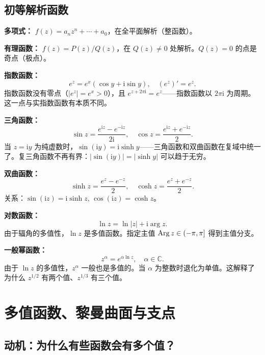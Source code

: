 \subsection{初等解析函数}

\textbf{多项式：} $f(z) = a_n z^n + \cdots + a_0$，在全平面解析（整函数）。

\textbf{有理函数：} $f(z) = P(z)/Q(z)$，在 $Q(z)\neq0$ 处解析。$Q(z)=0$ 的点是奇点（极点）。

\textbf{指数函数：}
\begin{equation}
e^z = e^x(\cos y + \mathrm{i}\sin y),\quad
(e^z)' = e^z.
\end{equation}
指数函数没有零点（$|e^z| = e^x > 0$），且 $e^{z+2\pi\mathrm{i}} = e^z$——指数函数以 $2\pi\mathrm{i}$ 为周期。这一点与实指数函数有本质不同。

\textbf{三角函数：}
\begin{equation}
\sin z = \frac{e^{\mathrm{i}z} - e^{-\mathrm{i}z}}{2\mathrm{i}},\quad
\cos z = \frac{e^{\mathrm{i}z} + e^{-\mathrm{i}z}}{2}.
\end{equation}
当 $z=\mathrm{i}y$ 为纯虚数时，$\sin(\mathrm{i}y) = \mathrm{i}\sinh y$——三角函数和双曲函数在复域中统一了。复三角函数不再有界：$|\sin(\mathrm{i}y)| = |\sinh y|$ 可以趋于无穷。

\textbf{双曲函数：}
\begin{equation}
\sinh z = \frac{e^z - e^{-z}}{2},\quad
\cosh z = \frac{e^z + e^{-z}}{2}.
\end{equation}
关系：$\sin(\mathrm{i}z) = \mathrm{i}\sinh z$, $\cos(\mathrm{i}z) = \cosh z$。

\textbf{对数函数：}
\begin{equation}
\ln z = \ln|z| + \mathrm{i}\arg z.
\end{equation}
由于辐角的多值性，$\ln z$ 是多值函数。指定主值 $\operatorname{Arg} z \in (-\pi,\pi]$ 得到主值分支。

\textbf{一般幂函数：}
\begin{equation}
z^\alpha = e^{\alpha\ln z},\quad \alpha\in\mathbb{C}.
\end{equation}
由于 $\ln z$ 的多值性，$z^\alpha$ 一般也是多值的。当 $\alpha$ 为整数时退化为单值。这解释了为什么 $z^{1/2}$ 有两个值、$z^{1/3}$ 有三个值。

\section{多值函数、黎曼曲面与支点}
\label{sec:multivalued}

\subsection*{动机：为什么有些函数会有多个值？}

